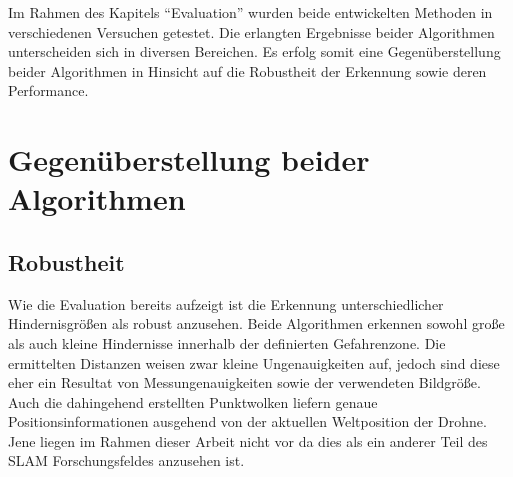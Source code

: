 Im Rahmen des Kapitels \enquote{Evaluation} wurden beide entwickelten Methoden in verschiedenen Versuchen getestet. Die erlangten Ergebnisse beider Algorithmen unterscheiden sich in diversen Bereichen. Es erfolg somit eine Gegenüberstellung beider Algorithmen in Hinsicht auf die Robustheit der Erkennung sowie deren Performance.







% 

\section{Gegenüberstellung beider Algorithmen}
\label{sec:gegenueberstellung}

\subsection{Robustheit}
\label{subsec:discussion_robustness}
Wie die Evaluation bereits aufzeigt ist die Erkennung unterschiedlicher Hindernisgrößen als robust anzusehen. Beide Algorithmen erkennen sowohl große als auch kleine Hindernisse innerhalb der definierten Gefahrenzone. Die ermittelten Distanzen weisen zwar kleine Ungenauigkeiten auf, jedoch sind diese eher ein Resultat von Messungenauigkeiten sowie der verwendeten Bildgröße. Auch die dahingehend erstellten Punktwolken liefern genaue Positionsinformationen ausgehend von der aktuellen Weltposition der Drohne. Jene liegen im Rahmen dieser Arbeit nicht vor da dies als ein anderer Teil des SLAM Forschungsfeldes anzusehen ist.\\

